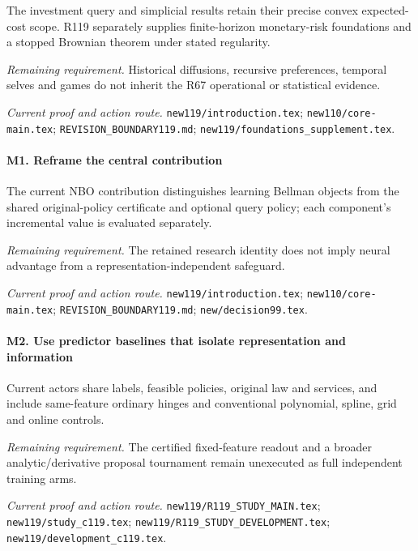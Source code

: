 The investment query and simplicial results retain their precise convex expected-cost scope. R119 separately supplies finite-horizon monetary-risk foundations and a stopped Brownian theorem under stated regularity.

\par\emph{Remaining requirement.} Historical diffusions, recursive preferences, temporal selves and games do not inherit the R67 operational or statistical evidence.

\par\emph{Current proof and action route.} \nolinkurl{new119/introduction.tex}; \nolinkurl{new110/core-main.tex}; \nolinkurl{REVISION_BOUNDARY119.md}; \nolinkurl{new119/foundations_supplement.tex}.

\paragraph{M1. Reframe the central contribution}

The current NBO contribution distinguishes learning Bellman objects from the shared original-policy certificate and optional query policy; each component's incremental value is evaluated separately.

\par\emph{Remaining requirement.} The retained research identity does not imply neural advantage from a representation-independent safeguard.

\par\emph{Current proof and action route.} \nolinkurl{new119/introduction.tex}; \nolinkurl{new110/core-main.tex}; \nolinkurl{REVISION_BOUNDARY119.md}; \nolinkurl{new/decision99.tex}.

\paragraph{M2. Use predictor baselines that isolate representation and information}

Current actors share labels, feasible policies, original law and services, and include same-feature ordinary hinges and conventional polynomial, spline, grid and online controls.

\par\emph{Remaining requirement.} The certified fixed-feature readout and a broader analytic/\allowbreak{}derivative proposal tournament remain unexecuted as full independent training arms.

\par\emph{Current proof and action route.} \nolinkurl{new119/R119_STUDY_MAIN.tex}; \nolinkurl{new119/study_c119.tex}; \nolinkurl{new119/R119_STUDY_DEVELOPMENT.tex}; \nolinkurl{new119/development_c119.tex}.

